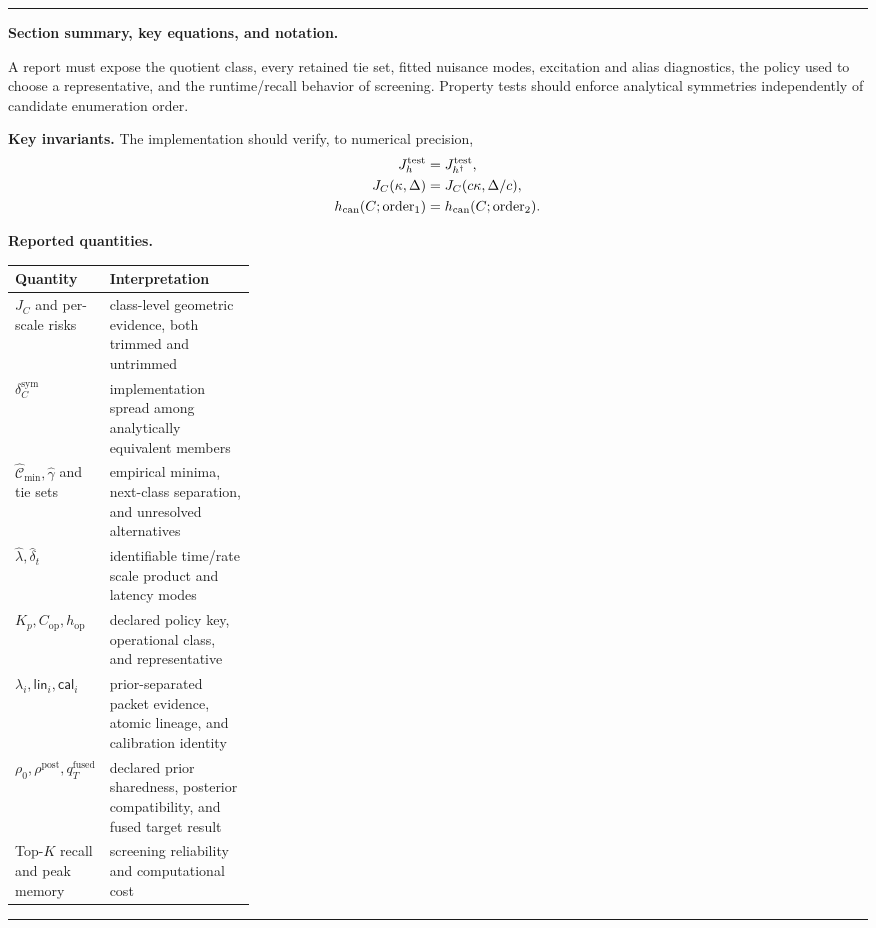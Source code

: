 \documentclass[11pt]{article}
\newenvironment{sectionrecap}
{\par\medskip\begingroup\small\noindent\rule{\linewidth}{0.4pt}\par
\smallskip\noindent\textbf{Section summary, key equations, and notation.}\par\smallskip}
{\par\smallskip\noindent\rule{\linewidth}{0.4pt}\par\endgroup\medskip}
\begin{document}
    \begin{sectionrecap}
        A report must expose the quotient class, every retained tie set, fitted nuisance modes,
        excitation and alias diagnostics, the policy used to choose a representative, and the
        runtime/recall behavior of screening. Property tests should enforce analytical
        symmetries independently of candidate enumeration order.

        \noindent\textbf{Key invariants.}
        The implementation should verify, to numerical precision,
        \begin{align*}
            J_h^{\rm test}&=J_{h^\dagger}^{\rm test},\\
            J_C(\kappa,\Delta)&=J_C(c\kappa,\Delta/c),\\
            h_{\mathrm{can}}(C;\mathrm{order}_1)
            &=h_{\mathrm{can}}(C;\mathrm{order}_2).
        \end{align*}

        \noindent\textbf{Reported quantities.}
        \par\noindent\begin{tabularx}{\linewidth}{@{}p{0.28\linewidth}Y@{}}
\toprule
Quantity & Interpretation \\
\midrule
$J_C$ and per-scale risks & class-level geometric evidence, both trimmed and untrimmed \\
$\delta_C^{\mathrm{sym}}$ & implementation spread among analytically equivalent members \\
$\widehat{\mathcal C}_{\min},\widehat\gamma$ and tie sets & empirical minima, next-class separation, and unresolved alternatives \\
$\widehat\lambda,\widehat\delta_t$ & identifiable time/rate scale product and latency modes \\
$K_p,C_{\mathrm{op}},h_{\mathrm{op}}$ & declared policy key, operational class, and representative \\
$\lambda_i,\mathsf{lin}_i,\mathsf{cal}_i$ & prior-separated packet evidence, atomic lineage, and calibration identity \\
$\rho_0,\rho^{\mathrm{post}},q_T^{\mathrm{fused}}$ & declared prior sharedness, posterior compatibility, and fused target result \\
Top-$K$ recall and peak memory & screening reliability and computational cost \\
\bottomrule
        \end{tabularx}
    \end{sectionrecap}
\end{document}
